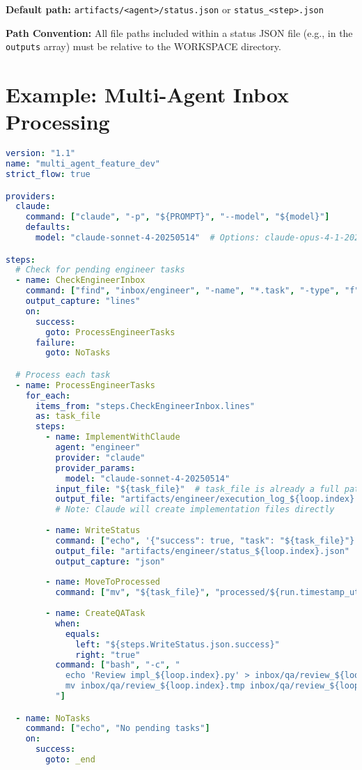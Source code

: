 \documentclass[11pt,a4paper]{article}
\begin{document}
\textbf{Default path:} \texttt{artifacts/<agent>/status.json} or \texttt{status\_<step>.json}

\textbf{Path Convention:} All file paths included within a status JSON file (e.g., in the \texttt{outputs} array) must be relative to the WORKSPACE directory.

\section{Example: Multi-Agent Inbox Processing}

\begin{lstlisting}[language=yaml, caption={Multi-Agent Feature Development Workflow}]
version: "1.1"
name: "multi_agent_feature_dev"
strict_flow: true

providers:
  claude:
    command: ["claude", "-p", "${PROMPT}", "--model", "${model}"]
    defaults:
      model: "claude-sonnet-4-20250514"  # Options: claude-opus-4-1-20250805

steps:
  # Check for pending engineer tasks
  - name: CheckEngineerInbox
    command: ["find", "inbox/engineer", "-name", "*.task", "-type", "f"]
    output_capture: "lines"
    on:
      success:
        goto: ProcessEngineerTasks
      failure:
        goto: NoTasks

  # Process each task
  - name: ProcessEngineerTasks
    for_each:
      items_from: "steps.CheckEngineerInbox.lines"
      as: task_file
      steps:
        - name: ImplementWithClaude
          agent: "engineer"
          provider: "claude"
          provider_params:
            model: "claude-sonnet-4-20250514"
          input_file: "${task_file}"  # task_file is already a full path from find
          output_file: "artifacts/engineer/execution_log_${loop.index}.md"
          # Note: Claude will create implementation files directly
          
        - name: WriteStatus
          command: ["echo", '{"success": true, "task": "${task_file}"}']
          output_file: "artifacts/engineer/status_${loop.index}.json"
          output_capture: "json"
          
        - name: MoveToProcessed
          command: ["mv", "${task_file}", "processed/${run.timestamp_utc}_${loop.index}/"]
          
        - name: CreateQATask
          when:
            equals:
              left: "${steps.WriteStatus.json.success}"
              right: "true"
          command: ["bash", "-c", "
            echo 'Review impl_${loop.index}.py' > inbox/qa/review_${loop.index}.tmp &&
            mv inbox/qa/review_${loop.index}.tmp inbox/qa/review_${loop.index}.task
          "]

  - name: NoTasks
    command: ["echo", "No pending tasks"]
    on:
      success:
        goto: _end
\end{lstlisting}
\end{document}
